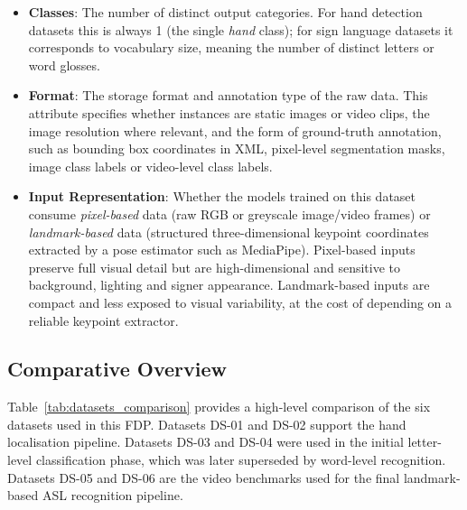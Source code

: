 \begin{itemize}
    \item \textbf{Classes}: The number of distinct output categories. For hand detection datasets this is always 1 (the single \textit{hand} class); for sign language datasets it corresponds to vocabulary size, meaning the number of distinct letters or word glosses.

    \item \textbf{Format}: The storage format and annotation type of the raw data. This attribute specifies whether instances are static images or video clips, the image resolution where relevant, and the form of ground-truth annotation, such as bounding box coordinates in XML, pixel-level segmentation masks, image class labels or video-level class labels.

    \item \textbf{Input Representation}: Whether the models trained on this dataset consume \textit{pixel-based} data (raw RGB or greyscale image/video frames) or \textit{landmark-based} data (structured three-dimensional keypoint coordinates extracted by a pose estimator such as MediaPipe). Pixel-based inputs preserve full visual detail but are high-dimensional and sensitive to background, lighting and signer appearance. Landmark-based inputs are compact and less exposed to visual variability, at the cost of depending on a reliable keypoint extractor.

\end{itemize}

\subsection{Comparative Overview}
\label{subsec:dataset_overview}

Table~\ref{tab:datasets_comparison} provides a high-level comparison of the six datasets used in
this FDP. Datasets DS-01 and DS-02 support the hand localisation pipeline. Datasets DS-03 and DS-04
were used in the initial letter-level classification phase, which was later superseded by
word-level recognition. Datasets DS-05 and DS-06 are the video benchmarks used for the final
landmark-based ASL recognition pipeline.

